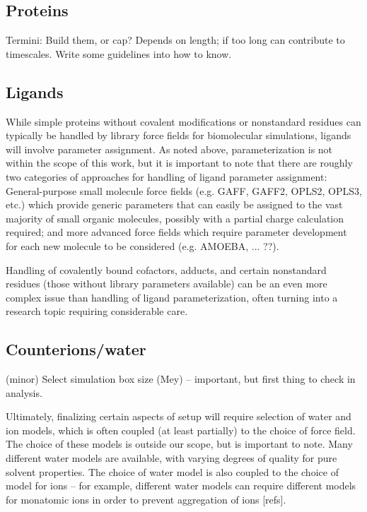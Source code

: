 \documentclass[9pt,bestpractices]{livecoms}
\begin{document}
\subsection{Proteins}

Termini: Build them, or cap? Depends on length; if too long can contribute to timescales. Write some guidelines into how to know. %

\subsection{Ligands}

While simple proteins without covalent modifications or nonstandard residues can typically be handled by library force fields for biomolecular simulations, ligands will involve parameter assignment.
As noted above, parameterization is not within the scope of this work, but it is important to note that there are roughly two categories of approaches for handling of ligand parameter assignment: 
General-purpose small molecule force fields (e.g. GAFF, GAFF2, OPLS2, OPLS3, etc.) %
which provide generic parameters that can easily be assigned to the vast majority of small organic molecules, possibly with a partial charge calculation required; and more advanced force fields which require parameter development for each new molecule to be considered (e.g. AMOEBA, ... ??). 

Handling of covalently bound cofactors, adducts, and certain nonstandard residues (those without library parameters available) can be an even more complex issue than handling of ligand parameterization, often turning into a research topic requiring considerable care. 

\subsection{Counterions/water}
(minor) Select simulation box size (Mey) -- important, but first thing to check in analysis.

Ultimately, finalizing certain aspects of setup will require selection of water and ion models, which is often coupled (at least partially) to the choice of force field.
The choice of these models is outside our scope, but is important to note. 
Many different water models are available, with varying degrees of quality for pure solvent properties.
The choice of water model is also coupled to the choice of model for ions -- for example, different water models can require different models for monatomic ions in order to prevent aggregation of ions [refs].
\end{document}
